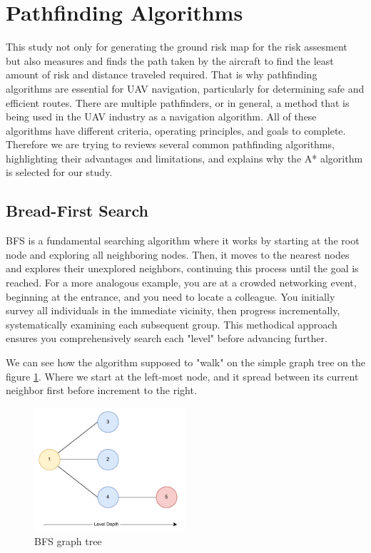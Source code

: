 \documentclass[12pt]{report}
\begin{document}
    \section{Pathfinding Algorithms}
        This study not only for generating the ground risk map for the risk assesment but also measures and finds the
        path taken by the aircraft to find the least amount of risk and distance traveled required. That is why
        pathfinding algorithms are essential for UAV navigation, particularly for determining safe and efficient routes.
        There are multiple pathfinders, or in general, a method that is being used in the UAV industry as a navigation
        algorithm. All of these algorithms have different criteria, operating principles, and goals to complete.
        Therefore we are trying to reviews several common pathfinding algorithms, highlighting their advantages and
        limitations, and explains why the A* algorithm is selected for our study.
        
        \subsection{Bread-First Search}
        \ac{BFS} is a fundamental searching algorithm where it works by starting at the root node and exploring all
        neighboring nodes. Then, it moves to the nearest nodes and explores their unexplored neighbors, continuing this
        process until the goal is reached. For a more analogous example, you are at a crowded networking event,
        beginning at the entrance, and you need to locate a colleague. You initially survey all individuals in the
        immediate vicinity, then progress incrementally, systematically examining each subsequent group. This methodical
        approach ensures you comprehensively search each "level" before advancing further.

        We can see how the algorithm supposed to "walk" on the simple graph tree on the figure \ref{fig:bfs}. Where we
        start at the left-most node, and it spread between its current neighbor first before increment to the right.

        \begin{figure}[H]
            \centering
            \includegraphics[width=0.5\textwidth]{General Image/OSM Drone-BFS.pdf}
            \caption{BFS graph tree}
            \label{fig:bfs}
        \end{figure}
\end{document}
